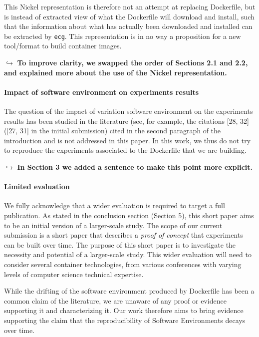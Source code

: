 \documentclass{article}
\begin{document}
This Nickel representation is therefore not an attempt at replacing Dockerfile, but is instead of extracted view of what the Dockerfile will download and install, such that the information about what has actually been downloaded and installed can be extracted by \texttt{ecg}.
This representation is in no way a proposition for a new tool/format to build container images.


$\hookrightarrow$ \textbf{To improve clarity, we swapped the order of Sections 2.1 and 2.2, and explained more about the use of the Nickel representation.}

\paragraph{Impact of software environment on experiments results}

The question of the impact of variation software environment on the experiments results has been studied in the literature (see, for example, the citations [28, 32] ([27, 31] in the initial submission) cited in the second paragraph of the introduction and is not addressed in this paper.
In this work, we thus do not try to reproduce the experiments associated to the Dockerfile that we are building.

$\hookrightarrow$ \textbf{In Section 3 we added a sentence to make this point more explicit.}


\paragraph{Limited evaluation}

We fully acknowledge that a wider evaluation is required to target a full publication.
As stated in the conclusion section (Section 5), this short paper aims to be an initial version of a larger-scale study.
The scope of our current submission is a short paper that describes a \emph{proof of concept} that experiments can be built over time.
The purpose of this short paper is to investigate the necessity and potential of a larger-scale study.
This wider evaluation will need to consider several container technologies, from various conferences with varying levels of computer science technical expertise.

While the drifting of the software environment produced by Dockerfile has been a common claim of the literature, we are unaware of any proof or evidence supporting it and characterizing it. %
Our work therefore aims to bring evidence supporting the claim that the reproducibility of Software Environments decays over time.
\end{document}
